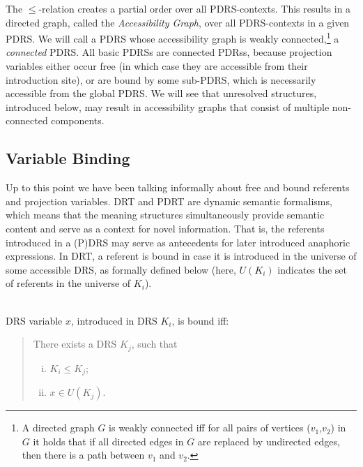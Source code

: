 The $\leq$-relation creates a partial order over all PDRS-contexts. This
results in a directed graph, called the \textit{Accessibility Graph}, over
all PDRS-contexts in a given PDRS. We will call a PDRS whose accessibility
graph is weakly connected,\footnote{A directed graph $G$ is weakly connected
iff for all pairs of vertices ($v_1$,$v_2$) in $G$ it holds that if all
directed edges in $G$ are replaced by undirected edges, then there is a path
between $v_1$ and $v_2$.} a \emph{connected} PDRS. All basic PDRSs are
connected PDRss, because projection variables either occur free (in which
case they are accessible from their introduction site), or are bound by some
sub-PDRS, which is necessarily accessible from the global PDRS. We will see
that unresolved structures, introduced below, may result in accessibility
graphs that consist of multiple non-connected components.


\subsection{Variable Binding}

Up to this point we have been talking informally about free and bound
referents and projection variables. DRT and PDRT are dynamic semantic
formalisms, which means that the meaning structures simultaneously provide
semantic content and serve as a context for novel information. That is, the
referents introduced in a (P)DRS may serve as antecedents for later
introduced anaphoric expressions. In DRT, a referent is bound in case it is
introduced in the universe of some accessible DRS, as formally defined below
(here, $U(K_i)$ indicates the set of referents in the universe of $K_i$).

\begin{definition}~\\
DRS variable $x$, introduced in DRS $K_i$, is bound iff:
\begin{quote}
There exists a DRS $K_j$, such that
\begin{enumerate}[i.]
  \item $K_i \leq K_j$;
  \item $x\in U(K_j)$. %
\end{enumerate}
\end{quote}
\end{definition}

